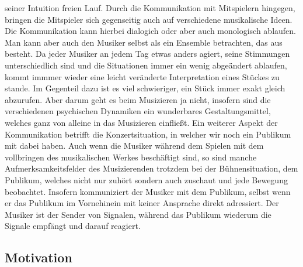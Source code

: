 seiner Intuition freien Lauf. Durch die Kommunikation mit Mitspielern hingegen,
bringen die Mitspieler sich gegenseitig auch auf verschiedene musikalische
Ideen. Die Kommunikation kann hierbei dialogich oder aber auch monologisch
ablaufen. \autocite[61]{doerne:umfassend_musizieren}
Man kann aber auch den Musiker selbst als ein Ensemble betrachten, das aus
 besteht. \autocite[64]{doerne:umfassend_musizieren} Da jeder Musiker
an jedem Tag etwas anders agiert, seine Stimmungen unterschiedlich sind und die
Situationen immer ein wenig abgeändert ablaufen, kommt immmer wieder eine leicht
veränderte Interpretation eines Stückes zu stande. Im Gegenteil dazu ist es viel
schwieriger, ein Stück immer exakt gleich abzurufen. Aber darum geht es beim
Musizieren ja nicht, insofern sind die verschiedenen psychischen Dynamiken ein
wunderbares Gestaltungsmittel, welches ganz von alleine in das Musizieren einfließt.
Ein weiterer Aspekt der Kommunikation betrifft die Konzertsituation, in welcher
wir noch ein Publikum mit dabei haben. Auch wenn die Musiker während dem Spielen
mit dem vollbringen des musikalischen Werkes beschäftigt sind, so sind manche
Aufmerksamkeitsfelder des Musizierenden trotzdem bei der Bühnensituation, dem
Publikum, welches nicht nur zuhört sondern auch zuschaut und jede Bewegung
beobachtet. Insofern kommuniziert der Musiker mit dem Publikum, selbst wenn er
das Publikum im Vornehinein mit keiner Ansprache direkt adressiert. Der Musiker
ist der Sender von Signalen, während das Publikum wiederum die Signale empfängt
und darauf reagiert. 



\subsection{Motivation}

